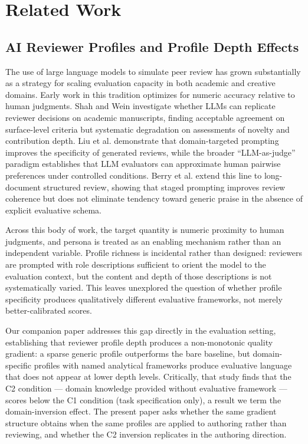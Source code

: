 \section{Related Work}

\subsection{AI Reviewer Profiles and Profile Depth Effects}

The use of large language models to simulate peer review has grown substantially as a strategy for scaling evaluation capacity in both academic and creative domains. Early work in this tradition optimizes for numeric accuracy relative to human judgments. Shah and Wein \cite{shah2023reviewers} investigate whether LLMs can replicate reviewer decisions on academic manuscripts, finding acceptable agreement on surface-level criteria but systematic degradation on assessments of novelty and contribution depth. Liu et al. \cite{liu2023reviewerbot} demonstrate that domain-targeted prompting improves the specificity of generated reviews, while the broader ``LLM-as-judge'' paradigm \cite{zheng2023judging} establishes that LLM evaluators can approximate human pairwise preferences under controlled conditions. Berry et al. \cite{berry2024aireviewer} extend this line to long-document structured review, showing that staged prompting improves review coherence but does not eliminate tendency toward generic praise in the absence of explicit evaluative schema.

Across this body of work, the target quantity is numeric proximity to human judgments, and persona is treated as an enabling mechanism rather than an independent variable. Profile richness is incidental rather than designed: reviewers are prompted with role descriptions sufficient to orient the model to the evaluation context, but the content and depth of those descriptions is not systematically varied. This leaves unexplored the question of whether profile specificity produces qualitatively different evaluative frameworks, not merely better-calibrated scores.

Our companion paper \cite{dellaLibera2025panelcreative} addresses this gap directly in the evaluation setting, establishing that reviewer profile depth produces a non-monotonic quality gradient: a sparse generic profile outperforms the bare baseline, but domain-specific profiles with named analytical frameworks produce evaluative language that does not appear at lower depth levels. Critically, that study finds that the C2 condition --- domain knowledge provided without evaluative framework --- scores below the C1 condition (task specification only), a result we term the domain-inversion effect. The present paper asks whether the same gradient structure obtains when the same profiles are applied to authoring rather than reviewing, and whether the C2 inversion replicates in the authoring direction.

